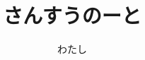 \documentclass[dvipdfmx]{jsarticle}
\begin{document}
  \title{さんすうのーと}
  \author{わたし}
  \maketitle
  \clearpage

  \tableofcontents

  
  
  
  
  
  
  
  
  
  
  
  
  
  
  
  
  
  
  
\end{document}
